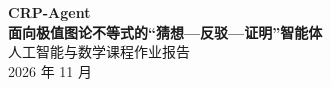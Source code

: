 \documentclass[12pt, a4paper]{ctexart}
\theoremstyle{definition}
\theoremstyle{plain}
\begin{document}
\begin{center}
  {\LARGE\bfseries CRP-Agent}\\[0.25cm]
  {\Large\bfseries 面向极值图论不等式的“猜想—反驳—证明”智能体}\\[0.7cm]
  {\large 人工智能与数学课程作业报告}\\[0.15cm]
  {\normalsize 2026 年 11 月}
\end{center}

\vspace{0.6cm}









\end{document}

